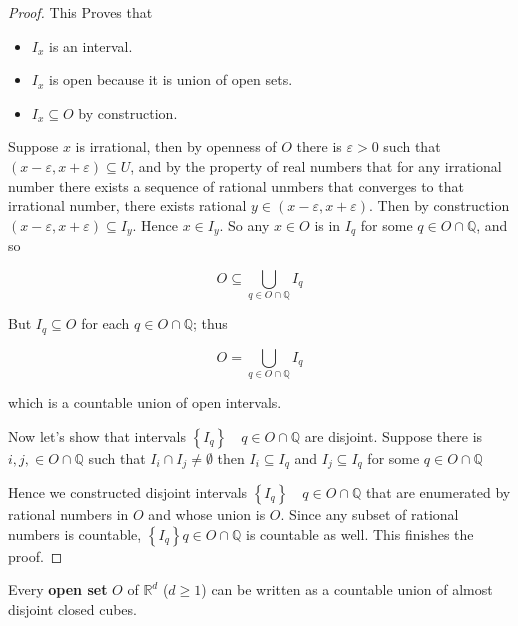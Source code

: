 \documentclass[UTF8,12pt,AutoFakeBold]{ctexbook}
\numberwithin{equation}{section}
\begin{document}
\begin{proof}
		This Proves that
		
		\begin{itemize}
			\item $I_x$ is an interval.
			\item $I_x$ is open because it is union of open sets.
			\item $I_x \subseteq O$ by construction.
		\end{itemize}
		
		Suppose $x$ is irrational, then by openness of $O$ there is $\varepsilon>0$ such that $(x-\varepsilon, x+\varepsilon) \subseteq U$, and by the property of real numbers that for any irrational number there exists a sequence of rational unmbers that converges to that irrational number, there exists rational $y \in(x-\varepsilon, x+\varepsilon)$. Then by construction $(x-\varepsilon, x+\varepsilon) \subseteq I_y$. Hence $x \in I_y$. So any $x \in O$ is in $I_q$ for some $q \in O \cap \mathbb{Q}$, and so
		
		$$
		O \subseteq \bigcup_{q \in O \cap \mathbb{Q}} I_q
		$$
		
		
		But $I_q \subseteq O$ for each $q \in O \cap \mathbb{Q}$; thus
		
		$$
		O=\bigcup_{q \in O \cap \mathbb{Q}} I_q
		$$
		
		which is a countable union of open intervals.
		
		
		Now let's show that intervals $\left\{I_q\right\} \quad q \in O \cap \mathbb{Q}$ are disjoint. Suppose there is $i, j, \in O \cap \mathbb{Q}$ such that $I_i \cap I_j \neq \emptyset$ then $I_i \subseteq I_q$ and $I_j \subseteq I_q$ for some $q \in O \cap \mathbb{Q}$
		
		Hence we constructed disjoint intervals $\left\{I_q\right\} \quad q \in O \cap \mathbb{Q}$ that are enumerated by rational numbers in $O$ and whose union is $O$. Since any subset of rational numbers is countable, $\left\{I_q\right\} q \in O \cap \mathbb{Q}$ is countable as well. This finishes the proof.
		
		
	\end{proof}
	
	\begin{theorem}
		Every \textbf{open set} $O$ of $\mathbb{R}^d$ ($d\ge 1$) can be written as a countable union of almost disjoint {\color{blue}closed cubes}.
	\end{theorem}
	
\end{document}
